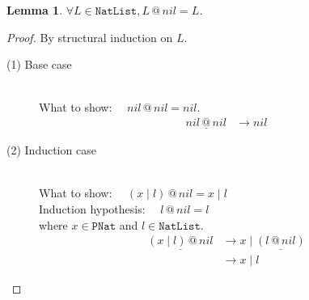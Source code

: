 \documentclass[12pt, a4paper]{article}
\newtheorem{lemma}[theorem]{Lemma}
\newcommand{\rel}[1]{\mathrel{#1}}
\newcommand{\larrow}{\longrightarrow}
\newcommand{\under}{\underline}
\begin{document}
\begin{lemma}
\label{lm2}
$\forall L \in \mathtt{NatList}, L \rel{@} nil = L$.
\end{lemma}
\begin{proof}
By structural induction on $L$.

\begin{description}

\item[(1) Base case]~\\
\noindent
What to show: $\quad nil \rel{@} nil = nil$.
\begin{align*}
\under{nil \rel{@} nil}
	&\larrow nil \tag{by @1}
\end{align*}

\item[(2) Induction case]~\\
What to show: $\quad (x \rel{|} l) \rel{@} nil = x \rel{|} l$ \\
Induction hypothesis: $\quad l \rel{@} nil = l$  \\
where $x \in \mathtt{PNat}$ and $l \in \mathtt{NatList}$.
\begin{align*}
\under{(x \rel{|} l) \rel{@} nil}
	&\larrow x \rel{|} \under{(l \rel{@} nil)} \tag{by @2} \\
	&\larrow x \rel{|} l \tag{by IH}
\end{align*}

\end{description}
\end{proof}
\end{document}
